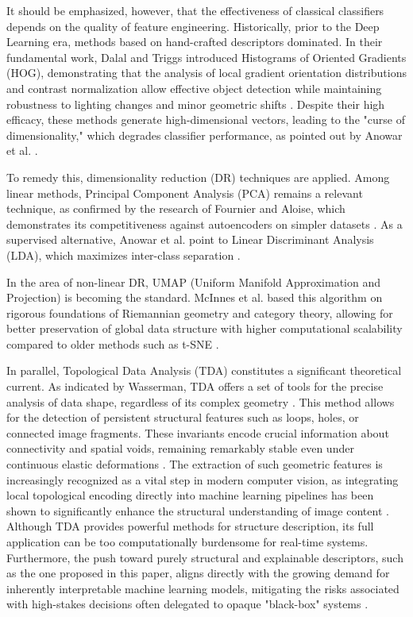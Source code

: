 \documentclass[a4paper,fleqn]{cas-dc}
\begin{document}
It should be emphasized, however, that the effectiveness of classical classifiers depends on the quality of feature engineering. Historically, prior to the Deep Learning era, methods based on hand-crafted descriptors dominated. In their fundamental work, Dalal and Triggs introduced Histograms of Oriented Gradients (HOG), demonstrating that the analysis of local gradient orientation distributions and contrast normalization allow effective object detection while maintaining robustness to lighting changes and minor geometric shifts \cite{dalal2005}. Despite their high efficacy, these methods generate high-dimensional vectors, leading to the "curse of dimensionality," which degrades classifier performance, as pointed out by Anowar et al. \cite{anowar2021}.

To remedy this, dimensionality reduction (DR) techniques are applied. Among linear methods, Principal Component Analysis (PCA) remains a relevant technique, as confirmed by the research of Fournier and Aloise, which demonstrates its competitiveness against autoencoders on simpler datasets \cite{fournier2019, jolliffe2016}. As a supervised alternative, Anowar et al. point to Linear Discriminant Analysis (LDA), which maximizes inter-class separation \cite{anowar2021}.

In the area of non-linear DR, UMAP (Uniform Manifold Approximation and Projection) is becoming the standard. McInnes et al. based this algorithm on rigorous foundations of Riemannian geometry and category theory, allowing for better preservation of global data structure with higher computational scalability compared to older methods such as t-SNE \cite{mcinnes2018}.

In parallel, Topological Data Analysis (TDA) constitutes a significant theoretical current. As indicated by Wasserman, TDA offers a set of tools for the precise analysis of data shape, regardless of its complex geometry \cite{wasserman2018}. This method allows for the detection of persistent structural features such as loops, holes, or connected image fragments. These invariants encode crucial information about connectivity and spatial voids, remaining remarkably stable even under continuous elastic deformations \cite{wasserman2018, tda_shapes_2025}. The extraction of such geometric features is increasingly recognized as a vital step in modern computer vision, as integrating local topological encoding directly into machine learning pipelines has been shown to significantly enhance the structural understanding of image content \cite{topoimages_2025}. Although TDA provides powerful methods for structure description, its full application can be too computationally burdensome for real-time systems. Furthermore, the push toward purely structural and explainable descriptors, such as the one proposed in this paper, aligns directly with the growing demand for inherently interpretable machine learning models, mitigating the risks associated with high-stakes decisions often delegated to opaque "black-box" systems \cite{rudin2019}.
\end{document}
